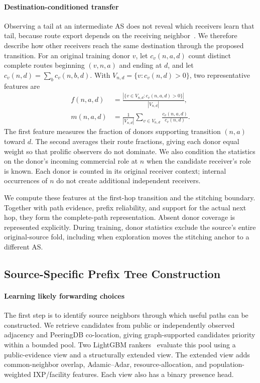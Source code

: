 \paragraph{Destination-conditioned transfer}
Observing a tail at an intermediate AS does not reveal which receivers
learn that tail, because route export depends on the receiving
neighbor~\cite{rfc4271}. We therefore describe how other receivers reach
the same destination through the proposed transition. For an original
training donor $v$, let $c_v(n,a,d)$ count distinct complete routes
beginning $(v,n,a)$ and ending at $d$, and let
$c_v(n,d)=\sum_b c_v(n,b,d)$. With
$V_{n,d}=\{v:c_v(n,d)>0\}$, two representative features are
\begin{equation}
\begin{split}
f(n,a,d)&=\frac{|\{v\in V_{n,d}:c_v(n,a,d)>0\}|}{|V_{n,d}|},\\
m(n,a,d)&=\frac{1}{|V_{n,d}|}\sum_{v\in V_{n,d}}
                         \frac{c_v(n,a,d)}{c_v(n,d)}.
\end{split}
\label{eq:destination_evidence}
\end{equation}
The first feature measures the fraction of donors supporting transition
$(n,a)$ toward $d$. The second averages their route fractions, giving
each donor equal weight so that prolific observers do not dominate. We
also condition the statistics on the donor's incoming commercial role at
$n$ when the candidate receiver's role is known. Each donor is counted
in its original receiver context; internal occurrences of $n$ do not
create additional independent receivers.

We compute these features at the first-hop transition and the stitching
boundary. Together with path evidence, prefix reliability, and support
for the actual next hop, they form the complete-path representation.
Absent donor coverage is represented explicitly. During training, donor
statistics exclude the source's entire original-source fold, including
when exploration moves the stitching anchor to a different AS.

\subsection{Source-Specific Prefix Tree Construction}
\label{sec:prefix_selection}

\paragraph{Learning likely forwarding choices}
The first step is to identify source neighbors through which useful
paths can be constructed. We retrieve candidates from public or
independently observed adjacency and PeeringDB co-location, giving
graph-supported candidates priority within a bounded pool. Two LightGBM
rankers~\cite{ke2017lightgbm} evaluate this pool using a public-evidence
view and a structurally extended view. The extended view adds
common-neighbor overlap, Adamic--Adar, resource-allocation, and
population-weighted IXP/facility features. Each view also has a binary
presence head.

